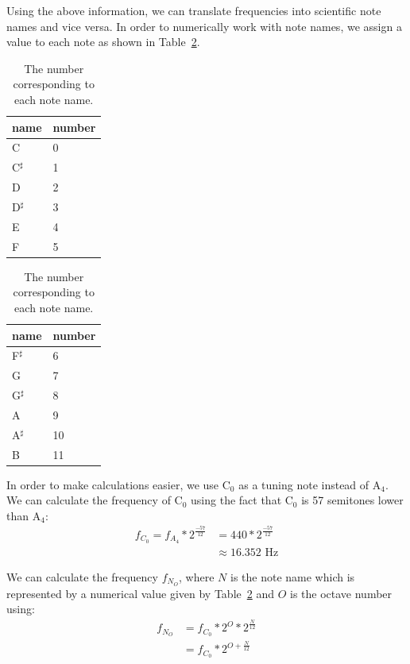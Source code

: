 \documentclass[a4paper,10pt,twocolumn]{article}
\newcommand{\note}[2]{#1${}_{#2}$}
\newcommand{\notesharp}[2]{#1${}_{#2}^{\sharp}$}
\begin{document}
Using the above information, we can translate frequencies into scientific note names and vice versa. In order to numerically work with note names, we assign a value to each note as shown in Table~\ref{tab:notenames}.
\begin{table}[h]
    \hfill
    \begin{center}
        \begin{tabular}
        {l|l}
            name & number \\
            \hline
            \note{C}{}      & 0 \\
            \notesharp{C}{} & 1 \\
            \note{D}{}      & 2 \\
            \notesharp{D}{} & 3 \\
            \note{E}{}      & 4 \\
            \note{F}{}      & 5
        \end{tabular}
        \qquad
        \begin{tabular}{l|l}
            name & number \\
            \hline
            \notesharp{F}{} & 6 \\
            \note{G}{}      & 7 \\
            \notesharp{G}{} & 8 \\
            \note{A}{}      & 9 \\
            \notesharp{A}{} & 10 \\
            \note{B}{}      & 11
        \end{tabular}
    \end{center}
    \hfill
    \caption{The number corresponding to each note name.}
    \label{tab:notenames}
\end{table}
In order to make calculations easier, we use \note{C}{0} as a tuning note instead of \note{A}{4}. We can calculate the frequency of \note{C}{0} using the fact that \note{C}{0} is 57 semitones lower than \note{A}{4}:
\begin{align*}
    f_{C_0} = f_{A_4} * 2^{\frac{-57}{12}} &= 440 * 2^{\frac{-57}{12}} \\
                                           &\approx 16.352 \text{ Hz}
\end{align*}

We can calculate the frequency $f_{N_O}$, where $N$ is the note name which is represented by a numerical value given by Table~\ref{tab:notenames} and $O$ is the octave number using:
\begin{align*}
    f_{N_O} &= f_{C_0} * 2^O * 2^{\frac{N}{12}} \\
            &= f_{C_0} * 2^{O + \frac{N}{12}}
\end{align*}
\end{document}
